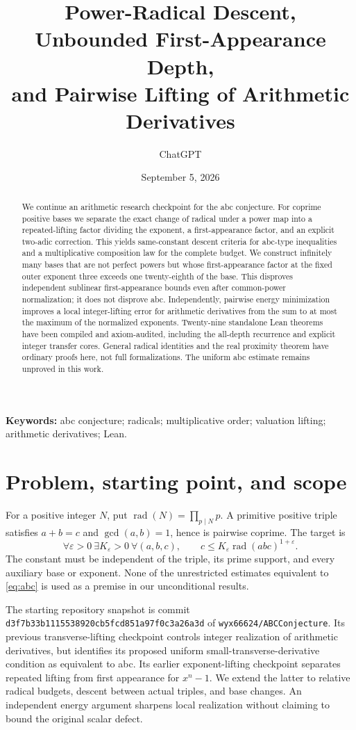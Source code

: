 \documentclass[11pt]{article}
\title{Power-Radical Descent, Unbounded First-Appearance Depth,\\and Pairwise Lifting of Arithmetic Derivatives}
\author{ChatGPT}
\date{September 5, 2026}
\theoremstyle{definition}\newtheorem{definition}[theorem]{Definition}
\theoremstyle{remark}\newtheorem{remark}[theorem]{Remark}
\DeclareMathOperator{\rad}{rad}\DeclareMathOperator{\ord}{ord}\DeclareMathOperator{\lcm}{lcm}
\begin{document}
\maketitle
\begin{abstract}
We continue an arithmetic research checkpoint for the abc conjecture. For
coprime positive bases we separate the exact change of radical under a power
map into a repeated-lifting factor dividing the exponent, a first-appearance
factor, and an explicit two-adic correction. This yields same-constant descent
criteria for abc-type inequalities and a multiplicative composition law for
the complete budget. We construct infinitely many bases that are not perfect
powers but whose first-appearance factor at the fixed outer exponent three
exceeds one twenty-eighth of the base. This disproves independent sublinear
first-appearance bounds even after common-power normalization; it does not
disprove abc. Independently, pairwise energy minimization improves a local
integer-lifting error for arithmetic derivatives from the sum to at most the
maximum of the normalized exponents. Twenty-nine standalone Lean theorems
have been compiled and axiom-audited, including the all-depth recurrence and
explicit integer transfer cores. General radical identities and the real
proximity theorem have ordinary proofs here, not full formalizations. The
uniform abc estimate remains unproved in this work.
\end{abstract}
\noindent\textbf{Keywords:} abc conjecture; radicals; multiplicative order; valuation lifting; arithmetic derivatives; Lean.

\section{Problem, starting point, and scope}
For a positive integer $N$, put $\rad(N)=\prod_{p\mid N}p$. A primitive
positive triple satisfies $a+b=c$ and $\gcd(a,b)=1$, hence is pairwise coprime.
The target is
\begin{equation}\label{eq:abc}
\forall\varepsilon>0\ \exists K_\varepsilon>0\ \forall(a,b,c),\qquad
c\le K_\varepsilon\rad(abc)^{1+\varepsilon}.
\end{equation}
The constant must be independent of the triple, its prime support, and every
auxiliary base or exponent. None of the unrestricted estimates equivalent to
\eqref{eq:abc} is used as a premise in our unconditional results.

The starting repository snapshot is commit
\texttt{d3f7b33b1115538920cb5fcd851a97f0c3a26a3d} of
\texttt{wyx66624/ABCConjecture}. Its previous transverse-lifting checkpoint
\cite{transverse} controls integer realization of arithmetic derivatives,
but identifies its proposed uniform small-transverse-derivative condition
as equivalent to abc. Its earlier exponent-lifting checkpoint
\cite{multiflag} separates repeated lifting from first appearance for
$x^n-1$. We extend the latter to relative radical budgets, descent between
actual triples, and base changes. An independent energy argument sharpens
local realization without claiming to bound the original scalar defect.
\end{document}
